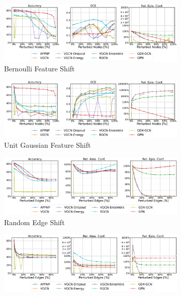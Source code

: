 \begin{figure}
    \centering
    \begin{subfigure}{\textwidth}
        \includegraphics[width=\textwidth]{resources/plots/AmazonComputers-bernoulli-shift.pdf}
        \caption{Bernoulli Feature Shift}
    \end{subfigure}
    \begin{subfigure}{\textwidth}
        \includegraphics[width=\textwidth]{resources/plots/AmazonComputers-normal-shift.pdf}
        \caption{Unit Gaussian Feature Shift}
    \end{subfigure}
    \begin{subfigure}{\textwidth}
        \includegraphics[width=\textwidth]{resources/plots/AmazonComputers-random-shift.pdf}
        \caption{Random Edge Shift}
    \end{subfigure}
    \begin{subfigure}{\textwidth}
        \includegraphics[width=\textwidth]{resources/plots/AmazonComputers-dice-shift.pdf}

\end{subfigure}
\end{figure}
